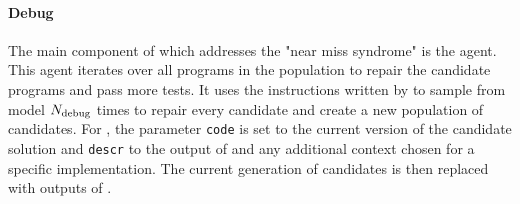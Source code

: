 \begin{comment}
We consider two different designs of the instruction generation block: \instructs{} and \instructllm{} shown in figure~\ref{fig:method-instruct}. 
Both types of blocks use failing I/O pairs from the validation set and \texttt{stderr} output of the candidate execution. 
In both blocks, if \texttt{stderr} is not empty, i.e., execution errors occur before getting the output to compare it with the expected output, the \texttt{stderr}-based template engine generates an instruction to fix the error mentioned in \texttt{stderr}. 
However, the blocks differ in the way they transform failing I/O pairs to generate instructions in case \texttt{stderr} is empty.

\instructs{} uses a fixed input template and substitutes placeholders for input and output with the corresponding strings of the first failing test case.
We show the resulting instruction for an exemplar template in figure~\ref{fig:method-instruct}.
By contrast, \instructllm{} uses the failing I/O pair in the LLM for text completion, thereby prompting the text LLM to produce the bug summary. 
An exemplar output of the code behavior template engine in figure~\ref{fig:method-instruct} describes that the code returns output O instead of expected output O$_{\text{val}}$ for the failing test case with input string I$_{\text{val}}.$
The LLM is then prompted to auto-complete this description of program behavior with the bug summary. 
The bug description is passed further to the next template engine and used as the debugging instruction, such as ``\emph{Fix~\{bug summary\}}''.
\end{comment}

\paragraph{Debug}

The main component of \method{} which addresses the "near miss syndrome" is the \debug{} agent.  
This agent iterates over all programs in the population to repair the candidate programs and pass more tests. 
It uses the instructions written by \instruct{} to sample from \debugmodel{} model $N_\text{debug}{}$ times
to repair every candidate and create a new population of \treearity{} candidates.
For \debugmodel{}, the parameter \texttt{code} is set to the current version of the candidate solution and \texttt{descr} to the output of \instruct{} and any additional context chosen for a specific implementation.
The current generation of candidates is then replaced with \treearity{} outputs of \debug{}.

